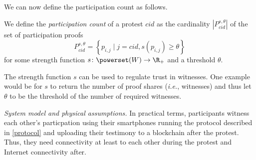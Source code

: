 We can now define the participation count as follows.
\begin{definition}
  We define the \emph{participation count} of a protest \(cid\) as the cardinality \(|P_{cid}^{s,\theta}|\) of the set of participation proofs \[
    P_{cid}^{s,\theta} = \left\{ p_{i,j} \mid
      j = cid, s(p_{i,j})\geq \theta \right\}
  \] for some strength function \(s\colon \powerset(W)\to \R_+\) and a threshold 
  \(\theta\).
\end{definition}
The strength function \(s\) can be used to regulate trust in witnesses.
One example would be for \(s\) to return the number of proof shares (\emph{i.e.}, witnesses) and thus let \(\theta\) to be the threshold of the number of required witnesses.

\emph{System model and physical assumptions.}
In practical terms, participants witness each other's particpation using their smartphones running the protocol described in \cref{protocol} and uploading their testimony to a blockchain after the protest. 
Thus, they need connectivity at least to each other during the protest and Internet connectivity after. 


